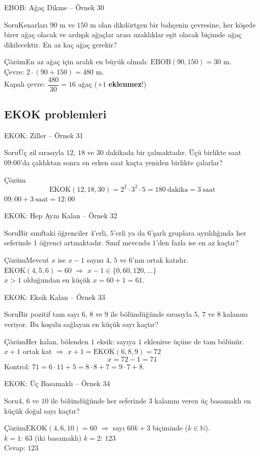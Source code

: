 \documentclass[aspectratio=169,11pt]{beamer}
\newcommand{\soru}[3]{%
\begin{frame}{#1}
  \begin{block}{Soru}\large #2\end{block}
  \pause
  \begin{exampleblock}{Çözüm}\large #3\end{exampleblock}
\end{frame}}
\begin{document}
\soru{EBOB: Ağaç Dikme -- Örnek 30}
{Kenarları \(90\) m ve \(150\) m olan dikdörtgen bir bahçenin çevresine, her köşede birer ağaç olacak ve ardışık ağaçlar arası uzaklıklar eşit olacak biçimde ağaç dikilecektir. En az kaç ağaç gerekir?}
{En az ağaç için aralık en büyük olmalı: \(\text{EBOB}(90,150)=30\) m.\\[3pt]
Çevre: \(2\cdot(90+150)=480\) m.\\[3pt]
Kapalı çevre: \(\dfrac{480}{30}=16\) ağaç \quad (\(+1\) \textbf{eklenmez}!)}

\subsection{EKOK problemleri}
\soru{EKOK: Ziller -- Örnek 31}
{Üç zil sırasıyla \(12\), \(18\) ve \(30\) dakikada bir çalmaktadır. Üçü birlikte saat 09{:}00'da çaldıktan sonra en erken saat kaçta yeniden birlikte çalarlar?}
{\[\text{EKOK}(12,18,30)=2^2\cdot 3^2\cdot 5=180\ \text{dakika}=3\ \text{saat}\]
\(09{:}00+3\ \text{saat}=12{:}00\)}

\soru{EKOK: Hep Aynı Kalan -- Örnek 32}
{Bir sınıftaki öğrenciler \(4\)'erli, \(5\)'erli ya da \(6\)'şarlı gruplara ayrıldığında her seferinde \(1\) öğrenci artmaktadır. Sınıf mevcudu \(1\)'den fazla ise en az kaçtır?}
{Mevcut \(x\) ise \(x-1\) sayısı \(4\), \(5\) ve \(6\)'nın ortak katıdır.\\[3pt]
\(\text{EKOK}(4,5,6)=60\) \(\Rightarrow\) \(x-1\in\{0,60,120,\dots\}\)\\[3pt]
\(x>1\) olduğundan en küçük \(x=60+1=61\).}

\soru{EKOK: Eksik Kalan -- Örnek 33}
{Bir pozitif tam sayı \(6\), \(8\) ve \(9\) ile bölündüğünde sırasıyla \(5\), \(7\) ve \(8\) kalanını veriyor. Bu koşulu sağlayan en küçük sayı kaçtır?}
{Her kalan, bölenden \(1\) eksik: sayıya \(1\) eklenirse üçüne de tam bölünür.\\[3pt]
\(x+1\) ortak kat \(\Rightarrow\) \(x+1=\text{EKOK}(6,8,9)=72\)
\[x=72-1=71\]
Kontrol: \(71=6\cdot 11+5=8\cdot 8+7=9\cdot 7+8\).}

\soru{EKOK: Üç Basamaklı -- Örnek 34}
{\(4\), \(6\) ve \(10\) ile bölündüğünde her seferinde \(3\) kalanını veren üç basamaklı en küçük doğal sayı kaçtır?}
{\(\text{EKOK}(4,6,10)=60\) \(\Rightarrow\) sayı \(60k+3\) biçiminde (\(k\in\mathbb{N}\)).\\[3pt]
\(k=1\): \(63\) (iki basamaklı) \quad \(k=2\): \(123\)\\[3pt]
Cevap: \(123\)}
\end{document}
